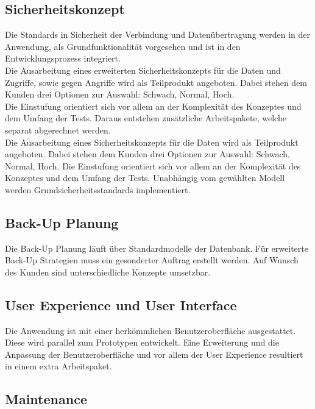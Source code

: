 	\subsection{Sicherheitskonzept}
	Die Standards in Sicherheit der Verbindung und Datenübertragung werden in der Anwendung, als Grundfunktionalität vorgesehen und ist in den Entwicklungsprozess integriert.\\
	\newline
	Die Ausarbeitung eines erweiterten Sicherheitskonzepts für die Daten und Zugriffe, sowie gegen Angriffe wird als Teilprodukt angeboten. Dabei stehen dem Kunden drei Optionen zur Auswahl: Schwach, Normal, Hoch. \\
	\newline
	Die Einstufung orientiert sich vor allem an der Komplexität des Konzeptes und dem Umfang der Tests. Daraus entstehen zusätzliche Arbeitspakete, welche separat abgerechnet werden. \\
	Die Ausarbeitung eines Sicherheitskonzepts für die Daten wird als Teilprodukt angeboten. Dabei stehen dem Kunden drei Optionen zur Auswahl: Schwach, Normal, Hoch. 
	Die Einstufung orientiert sich vor allem an der Komplexität des Konzeptes und dem Umfang der Tests. \newline	
	Unabhängig vom gewählten Modell werden  Grundsicherheitsstandards implementiert.

	\subsection{Back-Up Planung}
	
	Die Back-Up Planung läuft über Standardmodelle der Datenbank. Für erweiterte Back-Up Strategien muss ein gesonderter Auftrag erstellt werden. Auf Wunsch des Kunden sind unterschiedliche Konzepte umsetzbar.
	
	\subsection{User Experience und User Interface}
	
	Die Anwendung ist mit einer herkömmlichen Benutzeroberfläche ausgestattet. Diese wird parallel zum Prototypen entwickelt. Eine Erweiterung und die Anpassung der Benutzeroberfläche und vor allem der User Experience resultiert in einem extra Arbeitspaket.
	
	
	\subsection{Maintenance}
	
